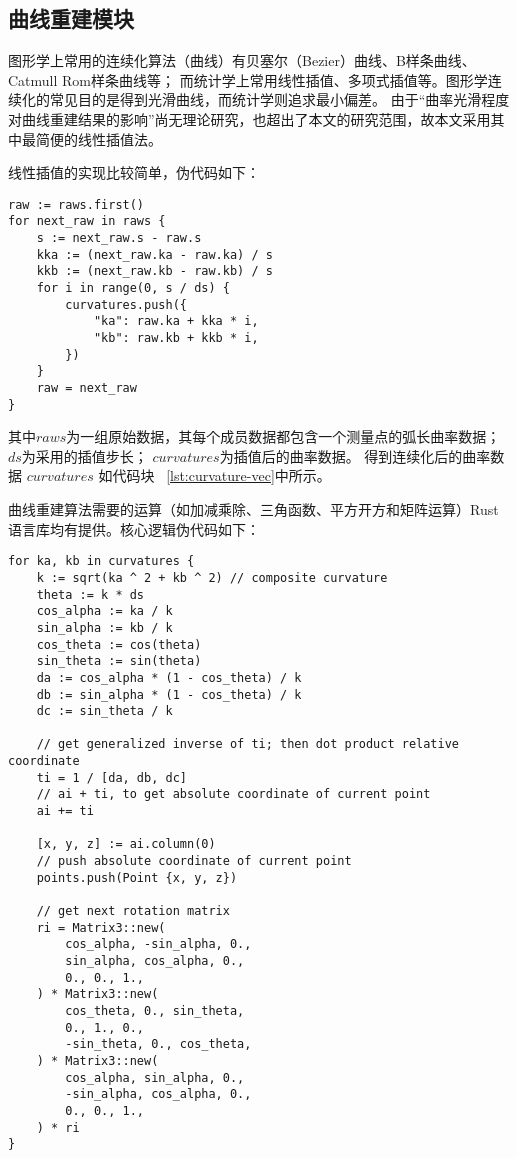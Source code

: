 \subsection{曲线重建模块}
图形学上常用的连续化算法（曲线）有贝塞尔（Bezier）曲线、B样条曲线、Catmull Rom样条曲线等；
而统计学上常用线性插值、多项式插值等。图形学连续化的常见目的是得到光滑曲线，而统计学则追求最小偏差。
由于“曲率光滑程度对曲线重建结果的影响”尚无理论研究，也超出了本文的研究范围，故本文采用其中最简便的线性插值法。

线性插值的实现比较简单，伪代码如下：

\begin{lstlisting}[caption={线性插值法}]
raw := raws.first()
for next_raw in raws {
    s := next_raw.s - raw.s
    kka := (next_raw.ka - raw.ka) / s
    kkb := (next_raw.kb - raw.kb) / s
    for i in range(0, s / ds) {
        curvatures.push({
            "ka": raw.ka + kka * i, 
            "kb": raw.kb + kkb * i,
        })
    }
    raw = next_raw
}
\end{lstlisting}

其中$raws$为一组原始数据，其每个成员数据都包含一个测量点的弧长曲率数据；
$ds$为采用的插值步长；
$curvatures$为插值后的曲率数据。
得到连续化后的曲率数据 $curvatures$ 如代码块 ~\ref{lst:curvature-vec}中所示。

曲线重建算法需要的运算（如加减乘除、三角函数、平方开方和矩阵运算）Rust语言库均有提供。核心逻辑伪代码如下：

\begin{lstlisting}[caption={曲线重建}]
for ka, kb in curvatures {
    k := sqrt(ka ^ 2 + kb ^ 2) // composite curvature
    theta := k * ds
    cos_alpha := ka / k
    sin_alpha := kb / k
    cos_theta := cos(theta)
    sin_theta := sin(theta)
    da := cos_alpha * (1 - cos_theta) / k
    db := sin_alpha * (1 - cos_theta) / k
    dc := sin_theta / k

    // get generalized inverse of ti; then dot product relative coordinate
    ti = 1 / [da, db, dc]
    // ai + ti, to get absolute coordinate of current point
    ai += ti

    [x, y, z] := ai.column(0)
    // push absolute coordinate of current point
    points.push(Point {x, y, z})

    // get next rotation matrix
    ri = Matrix3::new(
        cos_alpha, -sin_alpha, 0.,
        sin_alpha, cos_alpha, 0.,
        0., 0., 1.,
    ) * Matrix3::new(
        cos_theta, 0., sin_theta,
        0., 1., 0.,
        -sin_theta, 0., cos_theta,
    ) * Matrix3::new(
        cos_alpha, sin_alpha, 0.,
        -sin_alpha, cos_alpha, 0.,
        0., 0., 1.,
    ) * ri
}
\end{lstlisting}

